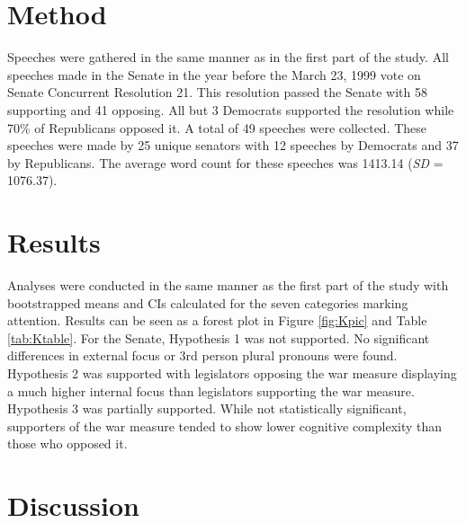\documentclass[english,,man,floatsintext]{apa6}
\begin{document}
\hypertarget{method-2}{%
\section{Method}\label{method-2}}

Speeches were gathered in the same manner as in the first part of the study. All speeches made in the Senate in the year before the March 23, 1999 vote on Senate Concurrent Resolution 21. This resolution passed the Senate with 58 supporting and 41 opposing. All but 3 Democrats supported the resolution while 70\% of Republicans opposed it. A total of 49 speeches were collected. These speeches were made by 25 unique senators with 12 speeches by Democrats and 37 by Republicans. The average word count for these speeches was 1413.14 (\emph{SD} = 1076.37).

\hypertarget{results-1}{%
\section{Results}\label{results-1}}

Analyses were conducted in the same manner as the first part of the study with bootstrapped means and CIs calculated for the seven categories marking attention. Results can be seen as a forest plot in Figure \ref{fig:Kpic} and Table \ref{tab:Ktable}. For the Senate, Hypothesis 1 was not supported. No significant differences in external focus or 3rd person plural pronouns were found. Hypothesis 2 was supported with legislators opposing the war measure displaying a much higher internal focus than legislators supporting the war measure. Hypothesis 3 was partially supported. While not statistically significant, supporters of the war measure tended to show lower cognitive complexity than those who opposed it.

\hypertarget{discussion}{%
\section{Discussion}\label{discussion}}
\end{document}
